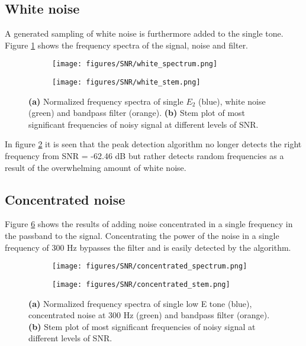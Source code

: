 \subsection{White noise}
A generated sampling of white noise is furthermore added to the single tone. Figure \ref{fig:white_spectrum} shows the frequency spectra of the signal, noise and filter.

\begin{figure}[H]
\begin{subfigure}{0.49\textwidth}
\centering
\texttt{[image: figures/SNR/white\_spectrum.png]}
\caption{}
\label{fig:white_spectrum}
\end{subfigure}
\begin{subfigure}{0.49\textwidth}
\centering
\texttt{[image: figures/SNR/white\_stem.png]}
\caption{}
\label{fig:white_stem}
\end{subfigure}
\caption{\textbf{(a)} Normalized frequency spectra of single $E_2$ (blue), white noise (green) and bandpass filter (orange). \textbf{(b)} Stem plot of most significant frequencies of noisy signal at different levels of SNR.}
\label{fig:white_noise}
\end{figure}

In figure \ref{fig:white_stem} it is seen that the peak detection algorithm no longer detects the right frequency from SNR = -62.46 dB but rather detects random frequencies as a result of the overwhelming amount of white noise.

\subsection{Concentrated noise}
Figure \ref{fig:concentrated_noise} shows the results of adding noise concentrated in a single frequency in the passband to the signal. Concentrating the power of the noise in a single frequency of 300 Hz bypasses the filter and is easily detected by the algorithm.

\begin{figure}[H]
\begin{subfigure}{0.49\textwidth}
\centering
\texttt{[image: figures/SNR/concentrated\_spectrum.png]}
\caption{}
\label{fig:concentrated_spectrum}
\end{subfigure}
\begin{subfigure}{0.49\textwidth}
\centering
\texttt{[image: figures/SNR/concentrated\_stem.png]}
\caption{}
\label{fig:concentrated_stem}
\end{subfigure}
\caption{\textbf{(a)} Normalized frequency spectra of single low E tone (blue), concentrated noise at 300 Hz (green) and bandpass filter (orange). \textbf{(b)} Stem plot of most significant frequencies of noisy signal at different levels of SNR.}
\label{fig:concentrated_noise}
\end{figure}

